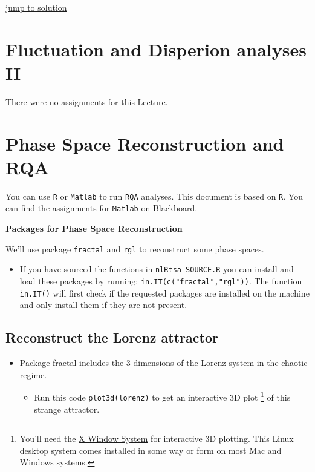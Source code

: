 \documentclass[]{book}
\providecommand{\tightlist}{%
  \setlength{\itemsep}{0pt}\setlength{\parskip}{0pt}}
\let\rmarkdownfootnote\footnote%
\def\footnote{\protect\rmarkdownfootnote}
\let\stdsection\section
\renewcommand\section{\newpage\stdsection}
\begin{document}
\protect\hyperlink{chaossol}{\textbar{} jump to solution \textbar{}}

\chapter{Fluctuation and Disperion analyses II}\label{fda2}

There were no assignments for this Lecture.

\chapter{\texorpdfstring{\textbf{Phase Space Reconstruction and
RQA}}{Phase Space Reconstruction and RQA}}\label{RQA}

You can use \texttt{R} or \texttt{Matlab} to run \texttt{RQA} analyses.
This document is based on \texttt{R}. You can find the assignments for
\texttt{Matlab} on Blackboard.

\textbf{Packages for Phase Space Reconstruction}

We'll use package \texttt{fractal} and \texttt{rgl} to reconstruct some
phase spaces.

\begin{itemize}
\tightlist
\item
  If you have sourced the functions in \texttt{nlRtsa\_SOURCE.R} you can
  install and load these packages by running:
  \texttt{in.IT(c("fractal","rgl"))}. The function \texttt{in.IT()} will
  first check if the requested packages are installed on the machine and
  only install them if they are not present.
\end{itemize}

\section{Reconstruct the Lorenz
attractor}\label{reconstruct-the-lorenz-attractor}

\begin{itemize}
\tightlist
\item
  Package fractal includes the 3 dimensions of the Lorenz system in the
  chaotic regime.

  \begin{itemize}
  \tightlist
  \item
    Run this code \texttt{plot3d(lorenz)} to get an interactive 3D plot
    \footnote{You'll need the \href{http://www.x.org/wiki/}{X Window
      System} for interactive 3D plotting. This Linux desktop system
      comes installed in some way or form on most Mac and Windows
      systems.} of this strange attractor.
  \end{itemize}
\end{itemize}
\end{document}
